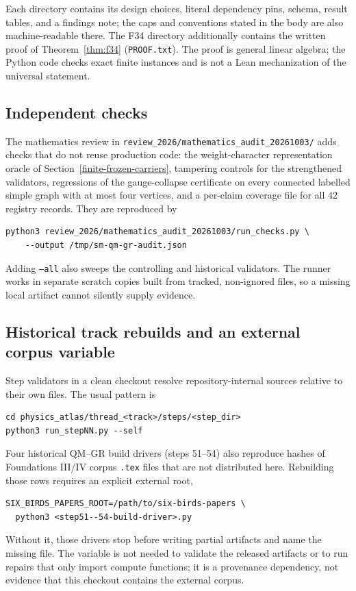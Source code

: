 \documentclass[11pt]{article}
\theoremstyle{definition}
\begin{document}
Each directory contains its design choices, literal dependency pins, schema, result tables, and a findings note; the
caps and conventions stated in the body are also machine-readable there. The F34 directory additionally contains the
written proof of Theorem~\ref{thm:f34} (\nolinkurl{PROOF.txt}). The proof is general linear algebra; the Python code
checks exact finite instances and is not a Lean mechanization of the universal statement.

\subsection{Independent checks}

The mathematics review in \nolinkurl{review_2026/mathematics_audit_20261003/} adds checks that do not reuse
production code: the weight-character representation oracle of Section~\ref{finite-frozen-carriers}, tampering
controls for the strengthened validators, regressions of the gauge-collapse certificate on every connected labelled
simple graph with at most four vertices, and a per-claim coverage file for all \(42\) registry records. They are
reproduced by
\begin{verbatim}
python3 review_2026/mathematics_audit_20261003/run_checks.py \
    --output /tmp/sm-qm-gr-audit.json
\end{verbatim}
Adding \texttt{--all} also sweeps the controlling and historical validators. The runner works in separate scratch
copies built from tracked, non-ignored files, so a missing local artifact cannot silently supply evidence.

\subsection{Historical track rebuilds and an external corpus variable}

Step validators in a clean checkout resolve repository-internal sources relative to their own files. The usual
pattern is
\begin{verbatim}
cd physics_atlas/thread_<track>/steps/<step_dir>
python3 run_stepNN.py --self
\end{verbatim}
Four historical QM--GR build drivers (steps 51--54) also reproduce hashes of Foundations III/IV corpus \texttt{.tex}
files that are not distributed here. Rebuilding those rows requires an explicit external root,
\begin{verbatim}
SIX_BIRDS_PAPERS_ROOT=/path/to/six-birds-papers \
  python3 <step51--54-build-driver>.py
\end{verbatim}
Without it, those drivers stop before writing partial artifacts and name the missing file. The variable is not needed
to validate the released artifacts or to run repairs that only import compute functions; it is a provenance
dependency, not evidence that this checkout contains the external corpus.
\end{document}
